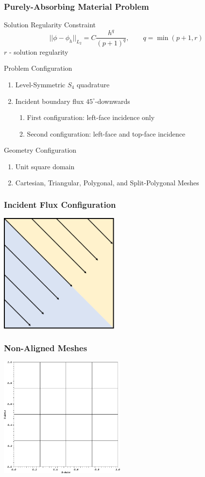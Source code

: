 \documentclass[compress,10pt]{beamer}
\begin{document}
\begin{frame}[t]
{
\frametitle{Purely-Absorbing Material Problem}
\begin{block}{Solution Regularity Constraint}
\begin{equation*}
||\phi - \phi_h||_{L_2} = C\frac{h^q}{(p+1)^{q}}, \qquad q = \min (p+1, r)
\end{equation*}
$r$ - solution regularity
\end{block}
\begin{block}{Problem Configuration}
\begin{enumerate}
\item Level-Symmetric $S_4$ quadrature
\item Incident boundary flux $45^{\circ}$-downwards
	\begin{enumerate}
	\item First configuration: left-face incidence only
	\item Second configuration: left-face and top-face incidence
	\end{enumerate}
\end{enumerate}
\end{block}
\begin{block}{Geometry Configuration}
\begin{enumerate}
\item Unit square domain
\item Cartesian, Triangular, Polygonal, and Split-Polygonal Meshes
\end{enumerate}
\end{block}
}
{
\frametitle{Incident Flux Configuration}
\vspace{1cm}
\hspace*{2.75cm}
{}\includegraphics[width=0.45\textwidth]{images/PA_Shading.png}
}
{
\frametitle{Non-Aligned Meshes}
\vspace{0.75cm}
\hspace*{0.25cm}
{}\includegraphics[width=0.475\textwidth]{images/PAMesh_Cart.png} 
}
\end{frame}
\end{document}
